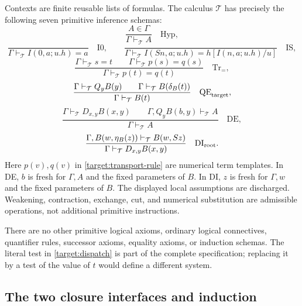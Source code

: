 Contexts are finite reusable lists of formulas.  The calculus $\mathcal T$
has precisely the following seven primitive inference schemas:
\[
 \frac{A\in\Gamma}{\Gamma\vdash_{\mathcal T}A}
 \quad\mathrm{Hyp},
\]
\[
 \frac{}{\Gamma\vdash_{\mathcal T}I(0,a;u.h)=a}
 \quad\mathrm{I0},
 \qquad
 \frac{}{\Gamma\vdash_{\mathcal T}
 I(Sn,a;u.h)=h[I(n,a;u.h)/u]}
 \quad\mathrm{IS},
\]
\begin{equation}
 \frac{\Gamma\vdash_{\mathcal T}s=t
       \qquad\Gamma\vdash_{\mathcal T}p(s)=q(s)}
      {\Gamma\vdash_{\mathcal T}p(t)=q(t)}
 \quad\mathrm{Tr}_{=},
 \label{target:transport-rule}
\end{equation}
\begin{equation}
 \frac{\Gamma\vdash_{\mathcal T}Q_yB(y)
       \qquad\Gamma\vdash_{\mathcal T}B(\delta_B(t))}
      {\Gamma\vdash_{\mathcal T}B(t)}
 \quad\mathrm{QE}_{\rm target},
 \label{target:elimination-rule}
\end{equation}
\begin{equation}
 \frac{\Gamma\vdash_{\mathcal T}D_{x,y}B(x,y)
       \qquad\Gamma,Q_yB(b,y)\vdash_{\mathcal T}A}
      {\Gamma\vdash_{\mathcal T}A}
 \quad\mathrm{DE},
 \label{target:de-rule}
\end{equation}
\begin{equation}
 \frac{\Gamma,B(w,\eta_B(z))\vdash_{\mathcal T}B(w,Sz)}
      {\Gamma\vdash_{\mathcal T}D_{x,y}B(x,y)}
 \quad\mathrm{DI}_{\rm root}.
 \label{target:di-rule}
\end{equation}
Here $p(v),q(v)$ in \eqref{target:transport-rule} are numerical term
templates.  In DE, $b$ is fresh for $\Gamma,A$ and the fixed parameters of
$B$.  In DI, $z$ is fresh for $\Gamma,w$ and the fixed parameters of $B$.
The displayed local assumptions are discharged.  Weakening, contraction,
exchange, cut, and numerical substitution are admissible operations, not
additional primitive instructions.

There are no other primitive logical axioms, ordinary logical connectives,
quantifier rules, successor axioms, equality axioms, or induction schemas.
The literal test in \eqref{target:dispatch} is part of the complete
specification; replacing it by a test of the value of $t$ would define a
different system.

\subsection{The two closure interfaces and induction}
\label{target:bootstrap}

